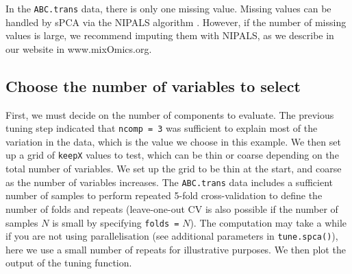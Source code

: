 \documentclass[
]{book}
\newenvironment{Shaded}{\begin{snugshade}}{\end{snugshade}}
\newcommand{\AttributeTok}[1]{\textcolor[rgb]{0.77,0.63,0.00}{#1}}
\newcommand{\CommentTok}[1]{\textcolor[rgb]{0.56,0.35,0.01}{\textit{#1}}}
\newcommand{\DecValTok}[1]{\textcolor[rgb]{0.00,0.00,0.81}{#1}}
\newcommand{\FunctionTok}[1]{\textcolor[rgb]{0.00,0.00,0.00}{#1}}
\newcommand{\NormalTok}[1]{#1}
\newcommand{\OtherTok}[1]{\textcolor[rgb]{0.56,0.35,0.01}{#1}}
\newcommand{\SpecialCharTok}[1]{\textcolor[rgb]{0.00,0.00,0.00}{#1}}
\begin{document}
In the \texttt{ABC.trans} data, there is only one missing value. Missing values can be handled by sPCA via the NIPALS algorithm . However, if the number of missing values is large, we recommend imputing them with NIPALS, as we describe in our website in www.mixOmics.org.

\hypertarget{03:spca-vars}{%
\subsection{Choose the number of variables to select}\label{03:spca-vars}}

First, we must decide on the number of components to evaluate. The previous tuning step indicated that \texttt{ncomp\ =\ 3} was sufficient to explain most of the variation in the data, which is the value we choose in this example. We then set up a grid of \texttt{keepX} values to test, which can be thin or coarse depending on the total number of variables. We set up the grid to be thin at the start, and coarse as the number of variables increases. The \texttt{ABC.trans} data includes a sufficient number of samples to perform repeated 5-fold cross-validation to define the number of folds and repeats (leave-one-out CV is also possible if the number of samples \(N\) is small by specifying \texttt{folds\ =} \(N\)). The computation may take a while if you are not using parallelisation (see additional parameters in \texttt{tune.spca()}), here we use a small number of repeats for illustrative purposes. We then plot the output of the tuning function.

\begin{Shaded}
\end{Shaded}
\end{document}

